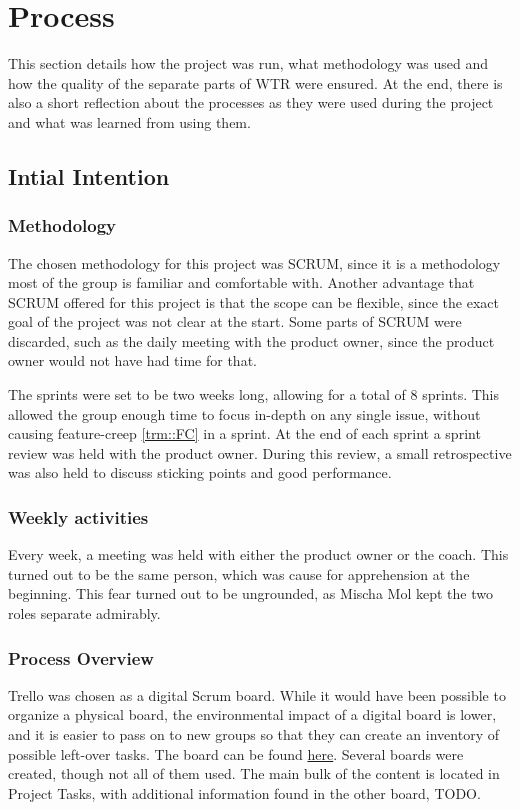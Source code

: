 \section{Process}
This section details how the project was run, what methodology was used and how the quality of the separate parts of WTR were ensured.
At the end, there is also a short reflection about the processes as they were used during the project and what was learned from using them.

\subsection{Intial Intention}
\subsubsection{Methodology}
The chosen methodology for this project was SCRUM, since it is a methodology most of the group is familiar and comfortable with.
Another advantage that SCRUM offered for this project is that the scope can be flexible, since the exact goal of the project was not clear at the start.
Some parts of SCRUM were discarded, such as the daily meeting with the product owner, since the product owner would not have had time for that.

The sprints were set to be two weeks long, allowing for a total of 8 sprints.
This allowed the group enough time to focus in-depth on any single issue, without causing feature-creep \ref{trm::FC} in a sprint.
At the end of each sprint a sprint review was held with the product owner.
During this review, a small retrospective was also held to discuss sticking points and good performance.

\subsubsection{Weekly activities}
Every week, a meeting was held with either the product owner or the coach.
This turned out to be the same person, which was cause for apprehension at the beginning.
This fear turned out to be ungrounded, as Mischa Mol kept the two roles separate admirably.

\subsubsection{Process Overview}
Trello was chosen as a digital Scrum board.
While it would have been possible to organize a physical board, the environmental impact of a digital board is lower, and it is easier to pass on to new groups so that they can create an inventory of possible left-over tasks.
The board can be found \href{https://trello.com/willytherobot/home}{here}.
Several boards were created, though not all of them used.
The main bulk of the content is located in Project Tasks, with additional information found in the other board, TODO.

